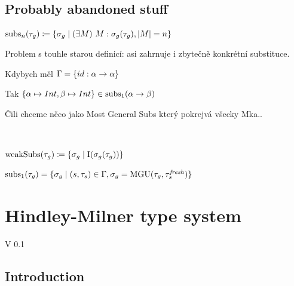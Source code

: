 \documentclass[a4paper,oneside]{memoir}
\begin{document}
~

~

\section{Probably abandoned stuff}

\newcommand{\subs}[2]{\op{subs}_{#2}(#1)}

\begin{preDefinition}
$ \subs{\tau_g}{n} \defi \{ \sigma_g \mid \E{M}{M : \sigma_g(\tau_g)}, \abs{M} = n \}$
\end{preDefinition}

Problem s touhle starou definicí: asi zahrnuje i zbytečně konkrétní substituce.

Kdybych měl $\Gamma = \{id : \alpha \rightarrow \alpha \}$

Tak $\{\alpha \mapsto Int, \beta \mapsto  Int\} \in \subs{\alpha \ar \beta}{1}$

Čili chceme něco jako Most General Subs který pokrejvá všecky Mka.. 



~










$ \operatorname{weakSubs}(\tau_g) \coloneqq \{ \sigma_g \mid \operatorname{I}(\sigma_g(\tau_g)) \}$


\begin{preLemma} 
$ \subs{\tau_g}{1} = \{ \sigma_g \mid (s,\tau_s) \in \Gamma, \sigma_g = \MGU{\tau_g}{\tau^\mathit{fresh}_s}  \} $
\end{preLemma} 



\chapter{Hindley-Milner type system}

V 0.1

\newcommand{\letin}[3]{\op{let}#1 = #2 \op{in} #3}
\newcommand{\W}{\op{\textbf{W}}}
\newcommand{\Mgu}{\op{\textbf{MGU}}}
\newcommand{\where}{\op{\textbf{where~}}}


\section{Introduction}

\end{document}

